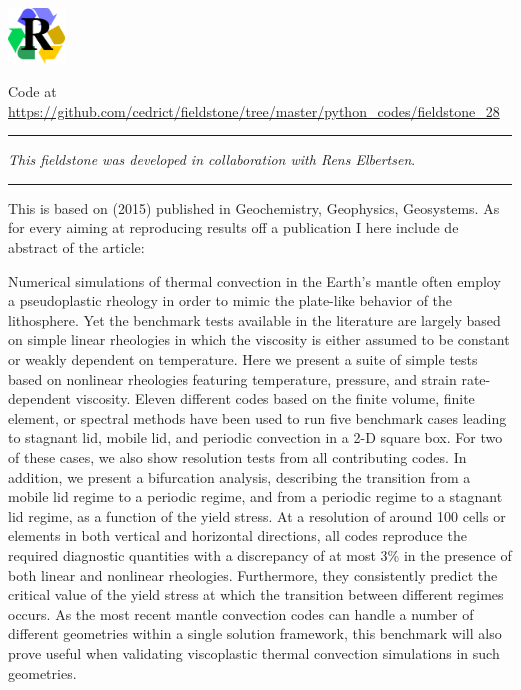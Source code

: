 
\includegraphics[width=1.5cm]{images/pictograms/replication}



\begin{center}
Code at \url{https://github.com/cedrict/fieldstone/tree/master/python_codes/fieldstone_28}
\end{center}

\par\noindent\rule{\textwidth}{0.4pt}

{\sl This fieldstone was developed in collaboration with Rens Elbertsen}. 

\par\noindent\rule{\textwidth}{0.4pt}

This \stone is based on \textcite{tosn15} (2015) published in Geochemistry, Geophysics, Geosystems.
As for every \stone aiming at reproducing results off a publication I here include de abstract
of the article:

\begin{center}
\begin{minipage}{13cm}
{\small
Numerical simulations of thermal convection in the Earth’s mantle often employ a pseudoplastic 
rheology in order to mimic the plate-like behavior of the lithosphere. Yet the benchmark tests available
in the literature are largely based on simple linear rheologies in which the viscosity is either assumed to be
constant or weakly dependent on temperature. Here we present a suite of simple tests based on nonlinear
rheologies featuring temperature, pressure, and strain rate-dependent viscosity. Eleven different codes
based on the finite volume, finite element, or spectral methods have been used to run five benchmark cases
leading to stagnant lid, mobile lid, and periodic convection in a 2-D square box. For two of these cases, we
also show resolution tests from all contributing codes. In addition, we present a bifurcation analysis, describing 
the transition from a mobile lid regime to a periodic regime, and from a periodic regime to a stagnant
lid regime, as a function of the yield stress. At a resolution of around 100 cells or elements in both vertical
and horizontal directions, all codes reproduce the required diagnostic quantities with a discrepancy of at
most 3\% in the presence of both linear and nonlinear rheologies. Furthermore, they consistently predict
the critical value of the yield stress at which the transition between different regimes occurs. As the most
recent mantle convection codes can handle a number of different geometries within a single solution
framework, this benchmark will also prove useful when validating viscoplastic thermal convection 
simulations in such geometries.}
\end{minipage}
\end{center}

